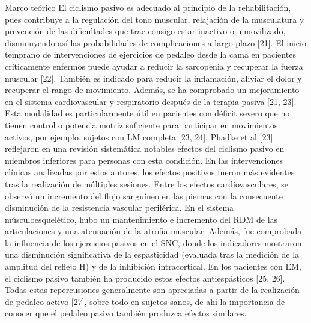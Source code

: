\begin{thesischapter}{1} {Marco teórico}
    \vspace{5pt}
    El ciclismo pasivo es adecuado al principio de la rehabilitación, pues contribuye a la
    regulación del tono muscular, relajación de la musculatura y prevención de las dificultades
    que trae consigo estar inactivo o inmovilizado, disminuyendo así las probabilidades de
    complicaciones a largo plazo [21]. El inicio temprano de intervenciones de ejercicios de
    pedaleo desde la cama en pacientes críticamente enfermos puede ayudar a reducir la
    sarcopenia y recuperar la fuerza muscular [22]. También es indicado para reducir la
    inflamación, aliviar el dolor y recuperar el rango de movimiento. Además, se ha
    comprobado un mejoramiento en el sistema cardiovascular y respiratorio después de la
    terapia pasiva [21, 23].
    Esta modalidad es particularmente útil en pacientes con déficit severo que no tienen
    control o potencia motriz suficiente para participar en movimientos activos, por ejemplo,
    sujetos con LM completa [23, 24]. Phadke et al [23] reflejaron en una revisión sistemática
    notables efectos del ciclismo pasivo en miembros inferiores para personas con esta
    condición. En las intervenciones clínicas analizadas por estos autores, los efectos
    positivos fueron más evidentes tras la realización de múltiples sesiones. Entre los efectos
    cardiovasculares, se observó un incremento del flujo sanguíneo en las piernas con la
    consecuente disminución de la resistencia vascular periférica. En el sistema
    músculoesquelético, hubo un mantenimiento e incremento del RDM de las articulaciones
    y una atenuación de la atrofia muscular. Además, fue comprobada la influencia de los
    ejercicios pasivos en el SNC, donde los indicadores mostraron una disminución
    significativa de la espasticidad (evaluada tras la medición de la amplitud del reflejo H) y
    de la inhibición intracortical. En los pacientes con EM, el ciclismo pasivo también ha
    producido estos efectos antiespásticos [25, 26]. Todas estas repercusiones generalmente
    son apreciadas a partir de la realización de pedaleo activo [27], sobre todo en sujetos
    sanos, de ahí la importancia de conocer que el pedaleo pasivo también produzca efectos
    similares.


\end{thesischapter}
